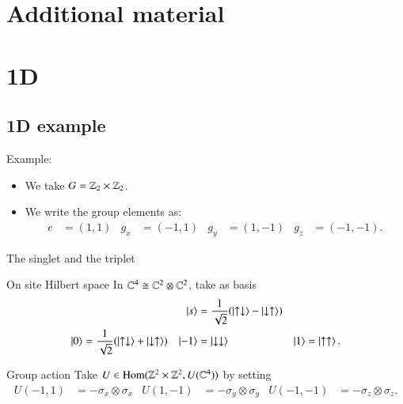 \documentclass{beamer}
\begin{document}
\section{Additional material}
\section{1D}
\subsection{1D example}

\begin{frame}{Example:}
	\begin{itemize}
		\item We take $G=\mathbb{Z}_2\times\mathbb{Z}_2$.
		\item We write the group elements as:
		\begin{align*}
			e&=(1,1)&g_x&=(-1,1)&g_y&=(1,-1)&g_z&=(-1,-1).
		\end{align*}
	\end{itemize}
	
\end{frame}

\begin{frame}{The singlet and the triplet}
	\begin{block}{On site Hilbert space}
		In $\mathbb{C}^4\cong \mathbb{C}^2\otimes \mathbb{C}^2$, take as basis
		\begin{align*}
			&&\ket{s}&=\frac{1}{\sqrt{2}}(\ket{\uparrow\downarrow}-\ket{\downarrow\uparrow})&&\\
			\ket{0}&=\frac{1}{\sqrt{2}}(\ket{\uparrow\downarrow}+\ket{\downarrow\uparrow})&\ket{-1}&=\ket{\downarrow\downarrow}&\ket{1}&=\ket{\uparrow\uparrow}.
		\end{align*}
	\end{block}
	\pause
	\begin{block}{Group action}
		Take $U\in \textrm{Hom}(\mathbb{Z}^2\times \mathbb{Z}^2,U(\mathbb{C}^4))$ by setting
		\begin{align*}
		U(-1,1)&=-\sigma_x\otimes \sigma_x&U(1,-1)&=-\sigma_y\otimes \sigma_y&U(-1,-1)&=-\sigma_z\otimes \sigma_z.
		\end{align*}
	\end{block}
\end{frame}
\end{document}
